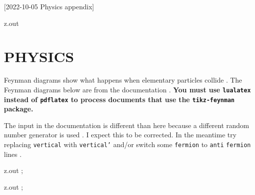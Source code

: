 [2022-10-05 Physics appendix]

\begin{VerbatimOut}{z.out}
\chapter{PHYSICS}

Feynman diagrams
show what happens
when elementary particles collide
\cite{feynman-diagram}.
The Feynman diagrams below are from the
 documentation \cite{ellis2016}.
\textbf{%
  You must use \texttt{lualatex} instead
  of \texttt{pdflatex}
  to process documents that use the \texttt{tikz-feynman} package.%
}

The input
in the documentation
is different than here because a different random number generator
is used \cite{menke2019}.
I expect this to be corrected.
In the meantime try replacing \texttt{vertical}
with \texttt{vertical'}
and/or switch some \texttt{fermion}
to \texttt{anti} \texttt{fermion} lines \cite{ellis2017}.
\end{VerbatimOut}

\MyIO


\begin{VerbatimOut}{z.out}
;
\end{VerbatimOut}

\MyIO


\begin{VerbatimOut}{z.out}
;
\end{VerbatimOut}

\MyIO
